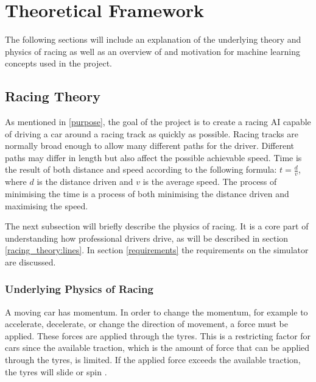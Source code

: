 \chapter{Theoretical Framework}


The following sections will include an explanation of the underlying theory and physics of racing as well as an overview of and motivation for machine learning concepts used in the project. 

\section{Racing Theory}
\label{racing_theory}

As mentioned in \ref{purpose}, the goal of the project is to create a racing AI capable of driving a car around a racing track as quickly as possible. Racing tracks are normally broad enough to allow many different paths for the driver. Different paths may differ in length but also affect the possible achievable speed. Time is the result of both distance and speed according to the following formula: \(t = \frac{d}{v}\), where $d$ is the distance driven and $v$ is the average speed. The process of minimising the time is a process of both minimising the distance driven and maximising the speed. 



The next subsection will briefly describe the physics of racing. It is a core part of understanding how professional drivers drive, as will be described in section \ref{racing_theory:lines}. In section \ref{requirements} the requirements on the simulator are discussed.

\subsection{Underlying Physics of Racing}
A moving car has momentum. In order to change the momentum, for example to accelerate, decelerate, or change the direction of movement, a force must be applied. These forces are applied through the tyres. This is a restricting factor for cars since the available traction, which is the amount of force that can be applied through the tyres, is limited. If the applied force exceeds the available traction, the tyres will slide or spin \cite{beckman}. 

